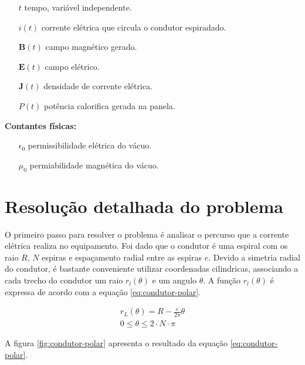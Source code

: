 \documentclass[
	article,			%
	11pt,				%
	oneside,			%
	a4paper,			%
	english,			%
	brazil,				%
	sumario=tradicional
	]{abntex2}
\begin{document}
\begin{itemize}
	\item[$ t $] tempo, variável independente.
	\item[$ i(t) $] corrente elétrica que circula o condutor espiradado.
	\item[$ \textbf{B}(t) $] campo magnético gerado.
	\item[$ \textbf{E}(t) $] campo elétrico.
	\item[$ \textbf{J}(t) $] densidade de corrente elétrica.
	\item[$ P(t) $] potência calorifica gerada na panela.
\end{itemize}

\textbf{Contantes físicas:}

\begin{itemize}
	\item[$ \epsilon_0 $] permissibilidade elétrica do vácuo.
	\item[$ \mu_0 $] permiabilidade magnética do vácuo.
\end{itemize}

\section{Resolução detalhada do problema}

O primeiro passo para resolver o problema é analisar o percurso que a corrente elétrica realiza no equipamento. Foi dado que o condutor é uma espiral com os raio $ R $, $ N $ espiras e espaçamento radial entre as espiras $ e $. Devido a simetria radial do condutor, é bastante conveniente utilizar coordenadas cilindricas, associando a cada trecho do condutor um raio $ r_l(\theta) $ e um angulo $ \theta $. A função $ r_l(\theta) $ é expressa de acordo com a equação \ref{eq:condutor-polar}.

\begin{equation} \label{eq:condutor-polar}
	\begin{array}{l}
		r_L(\theta) = R - \frac{e}{2\pi} \theta \\
		0 \le \theta \le 2\cdot N \cdot \pi
	\end{array}
\end{equation}

A figura \ref{fig:condutor-polar} apresenta o resultado da equação \ref{eq:condutor-polar}.
\end{document}
